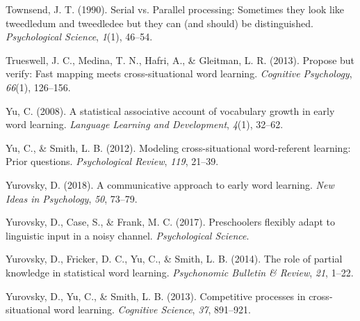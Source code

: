 \documentclass[english,,man,floatsintext]{apa6}
\begin{document}
\leavevmode\hypertarget{ref-townsend1990}{}%
Townsend, J. T. (1990). Serial vs. Parallel processing: Sometimes they look like tweedledum and tweedledee but they can (and should) be distinguished. \emph{Psychological Science}, \emph{1}(1), 46--54.

\leavevmode\hypertarget{ref-trueswell2013}{}%
Trueswell, J. C., Medina, T. N., Hafri, A., \& Gleitman, L. R. (2013). Propose but verify: Fast mapping meets cross-situational word learning. \emph{Cognitive Psychology}, \emph{66}(1), 126--156.

\leavevmode\hypertarget{ref-yu2008}{}%
Yu, C. (2008). A statistical associative account of vocabulary growth in early word learning. \emph{Language Learning and Development}, \emph{4}(1), 32--62.

\leavevmode\hypertarget{ref-yu2012}{}%
Yu, C., \& Smith, L. B. (2012). Modeling cross-situational word-referent learning: Prior questions. \emph{Psychological Review}, \emph{119}, 21--39.

\leavevmode\hypertarget{ref-yurovsky2018}{}%
Yurovsky, D. (2018). A communicative approach to early word learning. \emph{New Ideas in Psychology}, \emph{50}, 73--79.

\leavevmode\hypertarget{ref-yurovsky2016}{}%
Yurovsky, D., Case, S., \& Frank, M. C. (2017). Preschoolers flexibly adapt to linguistic input in a noisy channel. \emph{Psychological Science}.

\leavevmode\hypertarget{ref-yurovsky2014}{}%
Yurovsky, D., Fricker, D. C., Yu, C., \& Smith, L. B. (2014). The role of partial knowledge in statistical word learning. \emph{Psychonomic Bulletin \& Review}, \emph{21}, 1--22.

\leavevmode\hypertarget{ref-yurovsky2013}{}%
Yurovsky, D., Yu, C., \& Smith, L. B. (2013). Competitive processes in cross-situational word learning. \emph{Cognitive Science}, \emph{37}, 891--921.
\end{document}
